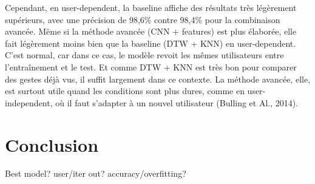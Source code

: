 \documentclass{article}
\begin{document}
Cependant, en user-dependent, la baseline affiche des résultats très légèrement supérieurs, 
avec une précision de 98,6\% contre 98,4\% pour la combinaison avancée. 
Même si la méthode avancée (CNN + features) est plus élaborée, 
elle fait légèrement moins bien que la baseline (DTW + KNN) en user-dependent. 
C’est normal, car dans ce cas, le modèle revoit les mêmes utilisateurs entre l’entraînement et le test. 
Et comme DTW + KNN est très bon pour comparer des gestes déjà vus, il suffit largement dans ce contexte. 
La méthode avancée, elle, est surtout utile quand les conditions sont plus dures, comme en user-independent, 
où il faut s’adapter à un nouvel utilisateur (Bulling et Al., 2014).

\section{Conclusion}
Best model? user/iter out?  accuracy/overfitting?



\end{document}
